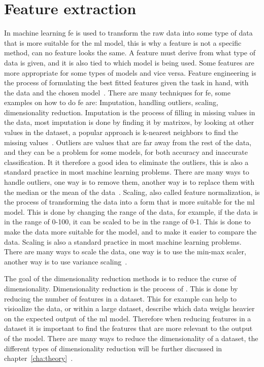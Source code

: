 \section{Feature extraction}\label{sec:feature-extraction}
In machine learning \gls{fe} is used to transform the raw data into some type of data that is more suitable for the \gls{ml} model, this is why a feature is not a specific method, can no feature looks the same. A feature must derive from what type of data is given, and it is also tied to which model is being used. Some features are more appropriate for some types of models and vice versa. Feature engineering is the process of formulating the best fitted features given the task in hand, with the data and the chosen model~\cite{Feature-engineering-zheng}. 
There are many techniques for \gls{fe}, some examples on how to do \gls{fe} are: Imputation, handling outliers, scaling, dimensionality reduction. Imputation is the process of filling in missing values in the data, most imputation is done by finding it by matrixes, by looking at other values in the dataset, a popular approach is k-nearest neighbors to find the missing values~\cite{imputation-for-tables-Biessmann}. Outliers are values that are far away from the rest of the data, and they can be a problem for some models, for both accuracy and inaccurate classification. It it therefore a good idea to eliminate the outliers, this is also a standard practice in most machine learning problems. There are many ways to handle outliers, one way is to remove them, another way is to replace them with the median or the mean of the data~\cite{outlier-perez}. Scaling, also called feature normalization, is the process of transforming the data into a form that is more suitable for the \gls{ml} model. This is done by changing the range of the data, for example, if the data is in the range of 0-100, it can be scaled to be in the range of 0-1. This is done to make the data more suitable for the model, and to make it easier to compare the data. Scaling is also a standard practice in most machine learning problems. There are many ways to scale the data, one way is to use the min-max scaler, another way is to use variance scaling~\cite{Feature-engineering-zheng}. 

The goal of the dimensionality reduction methods is to reduce the curse of dimensionality. 
Dimensionality reduction is the process of . This is done by reducing the number of features in a dataset. This for example can help to visioalize the data, or within a large dataset, describe which data weighs heavier on the expected output of the \gls{ml} model. Therefore when reducing features in a dataset it is important to find the features that are more relevant to the output of the model. There are many ways to reduce the dimensionality of a dataset, the different types of dimensionality reduction will be further discussed in chapter~\ref{cha:theory}~\cite{Feature-engineering-zheng}. 

